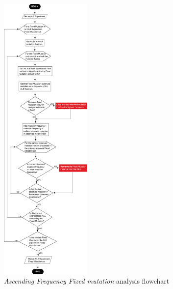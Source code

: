 \documentclass[12pt,final,masters,chapterheads]{ucsd}  %
\begin{document}
\begin{figure}[H]
  \caption{\textit{Ascending Frequency Fixed mutation} analysis flowchart}
  \centering
  \includegraphics[width=0.4\textwidth]{ascending_freq_fixation_mutation_filter_flowchart.png}
\end{figure}

%
%

%
%
\end{document}
